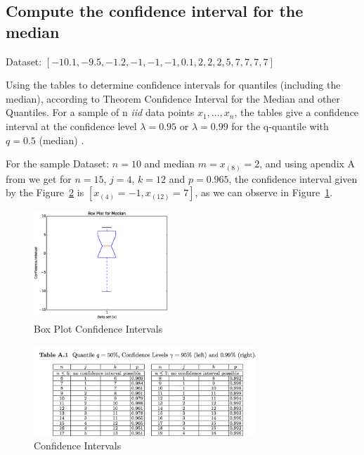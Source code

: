 \documentclass [12 pt , a4paper ] {article}
\begin{document}
\subsection{Compute the confidence interval for the median}
\par Dataset: $ [-10.1, -9.5, -1.2, -1, -1, -1, 0.1, 2, 2, 2, 5, 7, 7, 7, 7] $
\par Using the tables \cite{leboudec} to determine confidence intervals
for quantiles (including the median), according to Theorem Confidence Interval for the Median and other Quantiles.
For a sample of n \emph{iid} data points $x_1,...,x_n$,
the tables give a confidence interval at the confidence level $\lambda = 0.95$ or $ \lambda=0.99$
for the q-quantile with $q = 0.5$ (median) \cite{leboudec}.
\par For the sample Dataset: $n=10$ and median $m = x_{(8)} = 2$, and using apendix A from \cite{leboudec}
we get for $n=15$, $j=4$, $k=12$ and $p=0.965$, the confidence interval given by the Figure~\ref{fig:confidenceintervals}
is $[x_{(4)}=-1, x_{(12)}=7]$, as we can observe in Figure~\ref{fig:boxplot}.
\begin{figure}[!ht]
  \centering
  \includegraphics[scale=0.2,width=0.45\textwidth, natwidth=7000,natheight=1000]{boxplot.eps}
  \caption{Box Plot Confidence Intervals}
  \label{fig:boxplot}
\end{figure}
\begin{figure}[!ht]
  \centering
  \includegraphics[scale=0.2,width=0.75\textwidth, natwidth=7000,natheight=1000]{1.png}
  \caption{Confidence Intervals \cite{leboudec}}
  \label{fig:confidenceintervals}
\end{figure}
\end{document}
